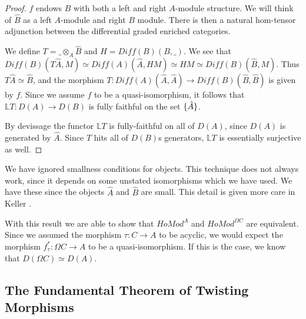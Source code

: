 \documentclass[../thesis.tex]{subfiles}
\begin{document}
            \begin{proof}
                $f$ endows $B$ with both a left and right $A$-module structure. We will think of $\hat{B}$ as a left $A$-module and right $B$ module. There is then a natural hom-tensor adjunction between the differential graded enriched categories.

                \begin{center}
                \end{center}

                We define $T = \_ \otimes_A \hat{B}$ and $H = Diff(B)(B,\_)$. We see that $Diff(B)(T\hat{A}, M)\simeq Diff(A)(\hat{A}, HM)\simeq HM \simeq Diff(B)(\hat{B}, M)$. Thus $T\hat{A}\simeq \hat{B}$, and the morphism $T : Diff(A)(\hat{A}, \hat{A}) \rightarrow Diff(B)(\hat{B}, \hat{B})$ is given by $f$. Since we assume $f$ to be a quasi-isomorphism, it follows that $\mathbb{L}T : D(A) \rightarrow D(B)$ is fully faithful on the set $\{\hat{A}\}$.

                By devissage the functor $\mathbb{L}T$ is fully-faithful on all of $D(A)$, since $D(A)$ is generated by $\hat{A}$. Since $T$ hits all of $D(B)$s generators, $\mathbb{L}T$ is essentially surjective as well.
            \end{proof}

            \begin{remark}
                We have ignored smallness conditions for objects. This technique does not always work, since it depends on some unstated isomorphisms which we have used. We have these since the objects $\hat{A}$ and $\hat{B}$ are small. This detail is given more care in Keller \cite{Keller94}.
            \end{remark}
                
            With this result we are able to show that $HoMod^A$ and $HoMod^{\Omega C}$ are equivalent. Since we assumed the morphism $\tau: C \rightarrow A$ to be acyclic, we would expect the morphism $f_\tau^* : \Omega C \rightarrow A$ to be a quasi-isomorphism. If this is the case, we know that $D(\Omega C)\simeq D(A)$. 

        \subsection{The Fundamental Theorem of Twisting Morphisms}
\end{document}
